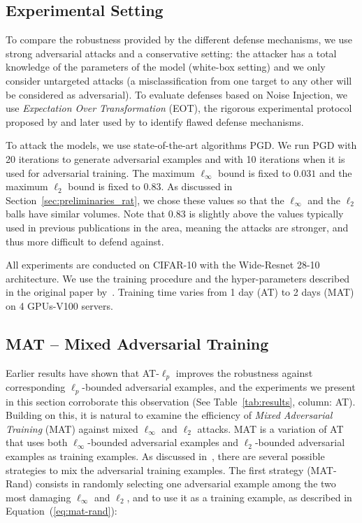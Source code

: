 \subsection{Experimental Setting}
\label{sec:experimental_settings}

To compare the robustness provided by the different defense mechanisms, we use strong adversarial attacks and a conservative setting: the attacker has a total knowledge of the parameters of the model (white-box setting) and we only consider untargeted attacks  (a misclassification from one target to any other will be considered as adversarial). To evaluate defenses based on Noise Injection, we use {\em Expectation Over Transformation} (EOT), the rigorous experimental protocol  proposed by \cite{athalye2017synthesizing} and later used by \cite{athalye2018obfuscated,carlini2019evaluating} to identify flawed defense mechanisms. 

To attack the models, we use state-of-the-art algorithms PGD. We run PGD with 20 iterations to generate adversarial examples and with 10 iterations when it is used for adversarial training. The maximum $\ell_\infty$ bound is fixed to $0.031$ and the maximum $\ell_2$ bound is fixed to $0.83$. As discussed in Section~\ref{sec:preliminaries_rat}, we chose these values so that the $\ell_\infty$ and the $\ell_2$ balls have similar volumes. Note that $0.83$ is slightly above the values typically used in previous publications in the area, meaning the attacks are stronger, and thus  more difficult to defend against.

All experiments are conducted on CIFAR-10 with the Wide-Resnet 28-10 architecture. We use the training procedure and the hyper-parameters described in the original paper by~\cite{ZagoruykoK16}. Training time varies from 1 day (AT) to 2 days (MAT) on 4 GPUs-V100 servers. 


\subsection{MAT -- Mixed Adversarial Training}\label{subsec:mixed_adversarial_training}
Earlier results have shown that AT-$\ell_p$ improves the robustness against corresponding $\ell_p$-bounded adversarial examples, and the experiments we present in this section corroborate this observation (See Table~\ref{tab:results}, column: AT). Building on this, it is natural to examine the efficiency of \emph{Mixed Adversarial Training} (MAT) against mixed $\ell_\infty$ and $\ell_2$ attacks. MAT is a variation of AT that uses both $\ell_\infty$-bounded adversarial examples and $\ell_2$-bounded adversarial examples as training examples. As discussed in~\cite{tramer2019adversarial}, there are several possible strategies to mix the adversarial training examples. The first strategy (MAT-Rand) consists in randomly selecting one adversarial example among the two most damaging $\ell_\infty$ and $\ell_2$, and to use it as a training example, as described in Equation~(\ref{eq:mat-rand}): 
